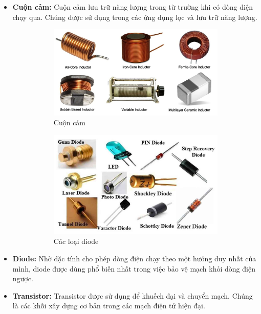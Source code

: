 \begin{itemize}
    \item \textbf{Cuộn cảm:} Cuộn cảm lưu trữ năng lượng trong từ trường khi có dòng điện chạy qua. Chúng được sử dụng trong các ứng dụng lọc và lưu trữ năng lượng.
    \begin{figure}[h!]
        \centering
        \begin{subfigure}{0.5\textwidth}
            \centering
            \includegraphics[width=\textwidth]{graphics/section2/inductors.png}
            \caption*{Cuộn cảm}
        \end{subfigure}
        \hfill
        \begin{subfigure}{0.45\textwidth}
            \centering
            \includegraphics[width=\textwidth]{graphics/section2/diodes.png}
            \caption*{Các loại diode}
        \end{subfigure}
        \caption*{}
    \end{figure}
    \item \textbf{Diode:} Nhờ dặc tính cho phép dòng điện chạy theo một hướng duy nhất của mình, diode được dùng phổ biến nhất trong việc bảo vệ mạch khỏi dòng điện ngược.
    \bigskip
        \item \textbf{Transistor:} Transistor được sử dụng để khuếch đại và chuyển mạch. Chúng là các khối xây dựng cơ bản trong các mạch điện tử hiện đại.
    

\end{itemize}
